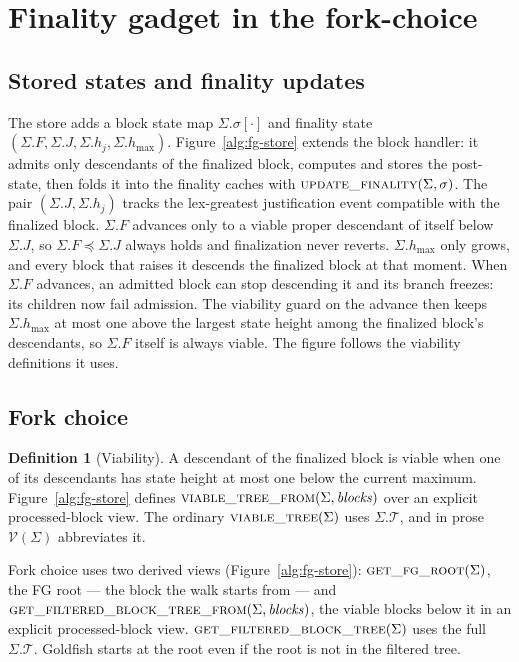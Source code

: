 \documentclass{article}
\theoremstyle{plain}
\theoremstyle{definition}
\newtheorem{definition}{Definition}
\theoremstyle{remark}
\newcommand{\T}{\mathcal T}
\newcommand{\viableTree}{\mathcal V}
\newcommand{\hmax}{h_{\max}}
\begin{document}
\section{Finality gadget in the fork-choice}\label{sec:fg-fork-choice}

\subsection{Stored states and finality updates}

The store adds a block state map $\Sigma.\sigma[\cdot]$ and finality state
$(\Sigma.F,\Sigma.J,\Sigma.h_j,\Sigma.\hmax)$.
Figure~\ref{alg:fg-store} extends the block handler: it admits only
descendants of the finalized block, computes and stores
the post-state, then folds it into the finality caches with
$\Call{update\_finality}{\Sigma,\sigma}$.  The pair
$(\Sigma.J,\Sigma.h_j)$ tracks the lex-greatest justification event
compatible with the finalized block.  $\Sigma.F$ advances
only to a viable proper descendant of itself below~$\Sigma.J$, so
$\Sigma.F\preceq\Sigma.J$ always holds and finalization never reverts.
$\Sigma.\hmax$ only grows, and every block that raises it descends the
finalized block at that moment.  When $\Sigma.F$ advances, an admitted
block can stop descending it and its branch freezes: its children now
fail admission.  The viability guard on the advance then keeps
$\Sigma.\hmax$ at most one above the largest state height among the
finalized block's descendants, so $\Sigma.F$ itself is always viable.
The figure follows the viability definitions it uses.

\subsection{Fork choice}

\begin{definition}[Viability]
\label{def:fg-candidate-tree}
A descendant of the finalized block is viable when one of its
descendants has state height at most one below the current maximum.
Figure~\ref{alg:fg-store} defines
$\Call{viable\_tree\_from}{\Sigma,\mathit{blocks}}$ over an explicit
processed-block view.  The ordinary
$\Call{viable\_tree}{\Sigma}$ uses $\Sigma.\T$, and in prose
$\viableTree(\Sigma)$ abbreviates it.
\end{definition}

Fork choice uses two derived views (Figure~\ref{alg:fg-store}):
$\Call{get\_fg\_root}{\Sigma}$, the FG root --- the block the walk
starts from --- and
$\Call{get\_filtered\_block\_tree\_from}{\Sigma,\mathit{blocks}}$,
the viable blocks below it in an explicit processed-block view.
$\Call{get\_filtered\_block\_tree}{\Sigma}$ uses the full
$\Sigma.\T$.  Goldfish starts at the root even if the root is not in
the filtered tree.
\end{document}
